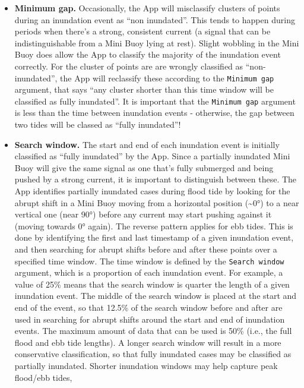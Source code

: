 \documentclass[
  letterpaper,
  DIV=11,
  numbers=noendperiod]{scrreprt}
\providecommand{\tightlist}{%
  \setlength{\itemsep}{0pt}\setlength{\parskip}{0pt}}\usepackage{longtable,booktabs,array}
\begin{document}
\begin{itemize}
\tightlist
\item
  \textbf{Minimum gap.} Occasionally, the App will misclassify clusters
  of points during an inundation event as ``non inundated''. This tends
  to happen during periods when there's a strong, consistent current (a
  signal that can be indistinguishable from a Mini Buoy lying at rest).
  Slight wobbling in the Mini Buoy does allow the App to classify the
  majority of the inundation event correctly. For the cluster of points
  are are wrongly classified as ``non-inundated'', the App will
  reclassify these according to the \texttt{Minimum\ gap} argument, that
  says ``any cluster shorter than this time window will be classified as
  fully inundated''. It is important that the \texttt{Minimum\ gap}
  argument is less than the time between inundation events - otherwise,
  the gap between two tides will be classed as ``fully inundated''!
\item
  \textbf{Search window.} The start and end of each inundation event is
  initially classified as ``fully inundated'' by the App. Since a
  partially inundated Mini Buoy will give the same signal as one that's
  fully submerged and being pushed by a strong current, it is important
  to distinguish between these. The App identifies partially inundated
  cases during flood tide by looking for the abrupt shift in a Mini Buoy
  moving from a horizontal position (\textasciitilde0°) to a near
  vertical one (near 90°) before any current may start pushing against
  it (moving towards 0° again). The reverse pattern applies for ebb
  tides. This is done by identifying the first and last timestamp of a
  given inundation event, and then searching for abrupt shifts before
  and after these points over a specified time window. The time window
  is defined by the \texttt{Search\ window} argument, which is a
  proportion of each inundation event. For example, a value of 25\%
  means that the search window is quarter the length of a given
  inundation event. The middle of the search window is placed at the
  start and end of the event, so that 12.5\% of the search window before
  and after are used in searching for abrupt shifts around the start and
  end of inundation events. The maximum amount of data that can be used
  is 50\% (i.e., the full flood and ebb tide lengths). A longer search
  window will result in a more conservative classification, so that
  fully inundated cases may be classified as partially inundated.
  Shorter inundation windows may help capture peak flood/ebb tides,

\end{itemize}
\end{document}
